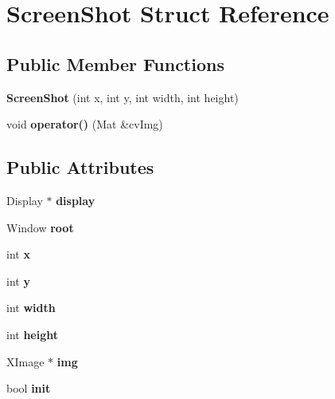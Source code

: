 \hypertarget{struct_screen_shot}{}\section{Screen\+Shot Struct Reference}
\label{struct_screen_shot}
\subsection*{Public Member Functions}
\begin{DoxyCompactItemize}
\item 
\mbox{\label{struct_screen_shot_a420ab4091f09cc75b24e4acea4fade77}} 
{\bfseries Screen\+Shot} (int x, int y, int width, int height)
\item 
\mbox{\label{struct_screen_shot_af97cd69859cfcd495789c5bfa5dc87a4}} 
void {\bfseries operator()} (Mat \&cv\+Img)
\end{DoxyCompactItemize}
\subsection*{Public Attributes}
\begin{DoxyCompactItemize}
\item 
\mbox{\label{struct_screen_shot_a5c431da3dc18806f4925353ca43c9089}} 
Display $\ast$ {\bfseries display}
\item 
\mbox{\label{struct_screen_shot_a3c66eb4571cd1e5113b656fb3ac8820b}} 
Window {\bfseries root}
\item 
\mbox{\label{struct_screen_shot_af2da7df6098097be3a51499fab3cdacf}} 
int {\bfseries x}
\item 
\mbox{\label{struct_screen_shot_a06e8ca521c0ba57825197e9c5aba1d9b}} 
int {\bfseries y}
\item 
\mbox{\label{struct_screen_shot_a0f783746a74ae0d6c848495261094925}} 
int {\bfseries width}
\item 
\mbox{\label{struct_screen_shot_ae38af2dd0b09e3be27f465941edf8418}} 
int {\bfseries height}
\item 
\mbox{\label{struct_screen_shot_aaf21aa932effe1876b5c4a2c52d5b77b}} 
X\+Image $\ast$ {\bfseries img}
\item 
\mbox{\label{struct_screen_shot_a05cbf0b41abb03d8c038ad3ccbb8fc64}} 
bool {\bfseries init}
\end{DoxyCompactItemize}


